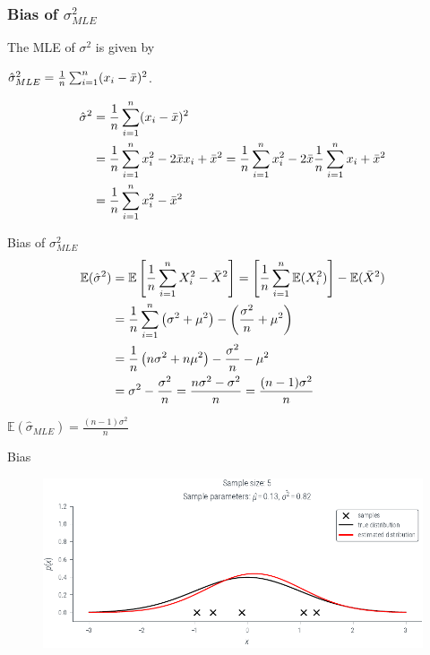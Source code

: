 \documentclass[handout]{beamer}
\begin{document}
    \begin{frame}
        \frametitle{Bias of $\sigma^2_{MLE}$}
        
        The MLE of $\sigma^2$ is given by
        
        $\hat{\sigma}^2_{MLE} = \frac{1}{n} \sum_{i=1}^n (x_i-\Bar{x})^2$.
        
        \begin{align*}
            \hat{\sigma}^2 &= \frac{1}{n} \sum_{i=1}^n (x_i-\Bar{x})^2 \\
            &= \frac{1}{n} \sum_{i=1}^n x_i^2 - 2\Bar{x} x_i + \Bar{x}^2 = \frac{1}{n} \sum_{i=1}^n x_i^2  -2\Bar{x}\frac{1}{n}\sum_{i=1}^nx_i+ \Bar{x}^2 \\
            &= \frac{1}{n}\sum_{i=1}^nx_i^2 - \Bar{x}^2
            \end{align*}

        \end{frame}

    \begin{frame}{Bias of $\sigma^2_{MLE}$}
        \begin{align*}
            \mathbb{E}(\hat{\sigma}^2) &=\mathbb{E}\left[\frac{1}{n}\sum_{i=1}^nX_i^2-\Bar{X}^2 \right] = \left[\frac{1}{n}\sum_{i=1}^n\mathbb{E}(X_i^2)\right]-\mathbb{E}(\Bar{X}^2)\\
            &=\frac{1}{n}\sum_{i=1}^n\left(\sigma^2+\mu^2\right) - \left(\frac{\sigma^2}{n}+\mu^2\right)\\
            &=\frac{1}{n}\left(n\sigma^2+n\mu^2\right) - \frac{\sigma^2}{n}-\mu^2\\
            &= \sigma^2 - \frac{\sigma^2}{n} = \frac{n\sigma^2-\sigma^2}{n} = \frac{(n-1)\sigma^2}{n}
        \end{align*}
        \begin{tcolorbox}[colback=metropolisblue!5,colframe=metropolisblue,title= Estimator $\hat{\sigma}_{MLE}$ is biased]
            $\mathbb{E}(\hat{\sigma}_{MLE}) = \frac{(n-1)\sigma^2}{n}$
        \end{tcolorbox}
    \end{frame}

        \begin{frame}{Bias }
            \begin{figure}
                \includegraphics{../figures/mle/biased-mle-normal-5-0.pdf}
            \end{figure}
            
        \end{frame}
\end{document}
